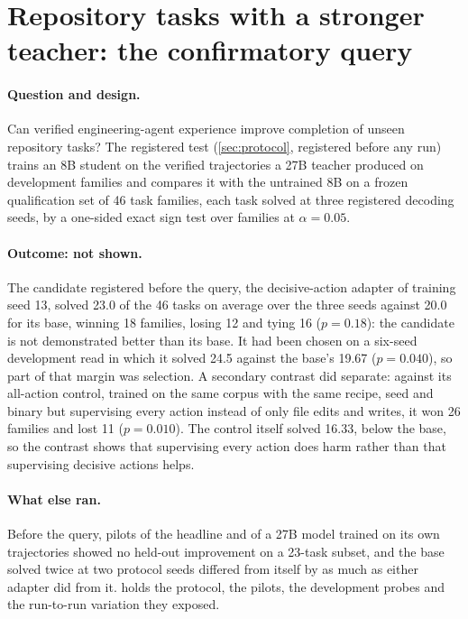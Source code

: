 
\section{Repository tasks with a stronger teacher: the confirmatory query}\label{sec:coding-summary}

\paragraph{Question and design.} Can verified engineering-agent experience improve completion of
unseen repository tasks? The registered test (\cref{sec:protocol}, registered before any run)
trains an 8B student on the verified trajectories a 27B teacher produced on development families and
compares it with the untrained 8B on a frozen qualification set of 46 task families, each task solved
at three registered decoding seeds, by a one-sided exact sign test over families at
$\alpha=0.05$.

\paragraph{Outcome: not shown.} The candidate registered before the query, the decisive-action adapter
of training seed 13, solved 23.0 of the 46 tasks on average over the three seeds against 20.0 for its
base, winning 18 families, losing 12 and tying 16 ($p=0.18$): the candidate is not demonstrated better
than its base. It had been chosen on a six-seed development read in which it solved 24.5
against the base's 19.67 ($p=0.040$), so part of that margin was selection. A secondary
contrast did separate: against its all-action control, trained on the same corpus with the same recipe,
seed and binary but supervising every action instead of only file edits and writes, it won 26 families
and lost 11 ($p=0.010$). The control itself solved 16.33, below the base, so the contrast shows that
supervising every action does harm rather than that supervising decisive actions helps.

\paragraph{What else ran.} Before the query, pilots of the headline and of a 27B model trained on its
own trajectories showed no held-out improvement on a 23-task subset, and the base solved twice at two
protocol seeds differed from itself by as much as either adapter did from it.
 holds the protocol, the pilots, the development probes and the run-to-run variation
they exposed.
